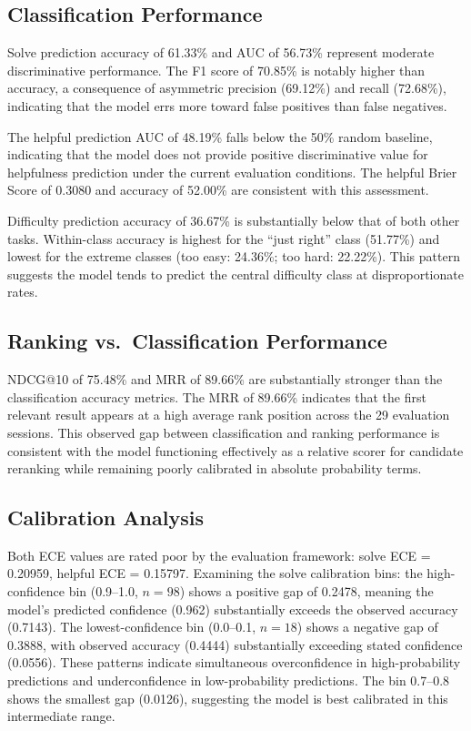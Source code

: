 \documentclass[12pt]{article}
\begin{document}
\subsection{Classification Performance}

Solve prediction accuracy of 61.33\% and AUC of 56.73\% represent moderate discriminative performance. The F1 score of 70.85\% is notably higher than accuracy, a consequence of asymmetric precision (69.12\%) and recall (72.68\%), indicating that the model errs more toward false positives than false negatives.

The helpful prediction AUC of 48.19\% falls below the 50\% random baseline, indicating that the model does not provide positive discriminative value for helpfulness prediction under the current evaluation conditions. The helpful Brier Score of 0.3080 and accuracy of 52.00\% are consistent with this assessment.

Difficulty prediction accuracy of 36.67\% is substantially below that of both other tasks. Within-class accuracy is highest for the ``just right'' class (51.77\%) and lowest for the extreme classes (too easy: 24.36\%; too hard: 22.22\%). This pattern suggests the model tends to predict the central difficulty class at disproportionate rates.

\subsection{Ranking vs.\ Classification Performance}

NDCG@10 of 75.48\% and MRR of 89.66\% are substantially stronger than the classification accuracy metrics. The MRR of 89.66\% indicates that the first relevant result appears at a high average rank position across the 29 evaluation sessions. This observed gap between classification and ranking performance is consistent with the model functioning effectively as a relative scorer for candidate reranking while remaining poorly calibrated in absolute probability terms.

\subsection{Calibration Analysis}

Both ECE values are rated poor by the evaluation framework: solve ECE = 0.20959, helpful ECE = 0.15797. Examining the solve calibration bins: the high-confidence bin (0.9--1.0, $n = 98$) shows a positive gap of 0.2478, meaning the model's predicted confidence (0.962) substantially exceeds the observed accuracy (0.7143). The lowest-confidence bin (0.0--0.1, $n = 18$) shows a negative gap of 0.3888, with observed accuracy (0.4444) substantially exceeding stated confidence (0.0556). These patterns indicate simultaneous overconfidence in high-probability predictions and underconfidence in low-probability predictions. The bin 0.7--0.8 shows the smallest gap (0.0126), suggesting the model is best calibrated in this intermediate range.
\end{document}
